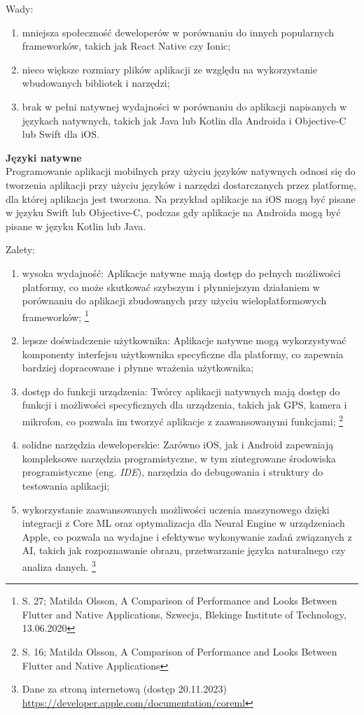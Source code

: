 \documentclass[12pt, a4paper, twoside, openany]{book}
\begin{document}
Wady:
\begin{enumerate}[label=--]
 \item mniejsza społeczność deweloperów w porównaniu do innych popularnych frameworków, takich jak React Native czy Ionic;
 \item nieco większe rozmiary plików aplikacji ze względu na wykorzystanie wbudowanych bibliotek i narzędzi;
 \item brak w pełni natywnej wydajności w porównaniu do aplikacji napisanych w językach natywnych, takich jak Java lub Kotlin dla Androida i Objective-C lub Swift dla iOS.
\end{enumerate}

\textbf{Języki natywne\\}
\indent Programowanie aplikacji mobilnych przy użyciu języków natywnych odnosi się do tworzenia aplikacji przy użyciu języków i narzędzi dostarczanych przez platformę, dla której aplikacja jest tworzona. Na przykład aplikacje na iOS mogą być pisane w języku Swift lub Objective-C, podczas gdy aplikacje na Androida mogą być pisane w języku Kotlin lub Java.
    
Zalety:
\begin{enumerate}[label=--]
    \item wysoka wydajność: Aplikacje natywne mają dostęp do pełnych możliwości platformy, co może skutkować szybszym i płynniejszym działaniem w porównaniu do aplikacji zbudowanych przy użyciu wieloplatformowych frameworków; \footnote{S. 27; Matilda Olsson, A Comparison of Performance and Looks Between Flutter and Native Applications, Szwecja, Blekinge Institute of Technology, 13.06.2020}
    \item lepsze doświadczenie użytkownika: Aplikacje natywne mogą wykorzystywać komponenty interfejsu użytkownika specyficzne dla platformy, co zapewnia bardziej dopracowane i płynne wrażenia użytkownika;
    \item dostęp do funkcji urządzenia: Twórcy aplikacji natywnych mają dostęp do funkcji i możliwości specyficznych dla urządzenia, takich jak GPS, kamera i mikrofon, co pozwala im tworzyć aplikacje z zaawansowanymi funkcjami; \footnote{S. 16; Matilda Olsson, A Comparison of Performance and Looks Between Flutter and Native Applications}
    \item solidne narzędzia deweloperskie: Zarówno iOS, jak i Android zapewniają kompleksowe narzędzia programistyczne, w tym zintegrowane środowiska programistyczne (eng. \textit{IDE}), narzędzia do debugowania i struktury do testowania aplikacji;
    \item wykorzystanie zaawansowanych możliwości uczenia maszynowego dzięki integracji z Core ML oraz optymalizacja dla Neural Engine w urządzeniach Apple, co pozwala na wydajne i efektywne wykonywanie zadań związanych z AI, takich jak rozpoznawanie obrazu, przetwarzanie języka naturalnego czy analiza danych. \footnote{ Dane za stroną internetową (dostęp 20.11.2023) \url{https://developer.apple.com/documentation/coreml} }
\end{enumerate}
\end{document}
